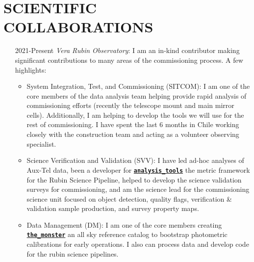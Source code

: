 \documentclass[11pt,letterpaper, sans]{moderncv}        %
\let\oldhref\href
\renewcommand{\href}[2]{\oldhref{#1}{\bfseries#2}}
\newcommand{\code}[1]{\texttt{#1}}
\begin{document}
\section{SCIENTIFIC COLLABORATIONS}
\begin{itemize}[itemsep=1pt, leftmargin=65pt]
    \item [2021-Present] \emph{Vera Rubin Observatory}: I am an in-kind contributor making significant contributions to many areas of the commissioning process. A few highlights:
    \begin{itemize}
        \item System Integration, Test, and Commissioning (SITCOM): I am one of the core members of the data analysis team helping provide rapid analysis of commissioning efforts (recently the telescope mount and main mirror cells). Additionally, I am helping to develop the tools we will use for the rest of commissioning. I have spent the last 6 months in Chile working closely with the construction team and acting as a volunteer observing specialist. 
        \item Science Verification and Validation (SVV): I have led ad-hoc analyses of Aux-Tel data, been a developer for \href{https://github.com/lsst/analysis_tools}{\code{analysis\_tools}} the metric framework for the Rubin Science Pipeline, helped to develop the science validation surveys for commissioning, and am the science lead for the commissioning science unit focused on object detection, quality flags, verification \& validation sample production, and survey property maps.
        \item Data Management (DM): I am one of the core members creating \href{https://github.com/lsst/analysis_tools}{\code{the\_monster}} an all sky reference catalog to bootstrap photometric calibrations for early operations. I also can process data and develop code for the rubin science pipelines. 
        

\end{itemize}
\end{itemize}
\end{document}
